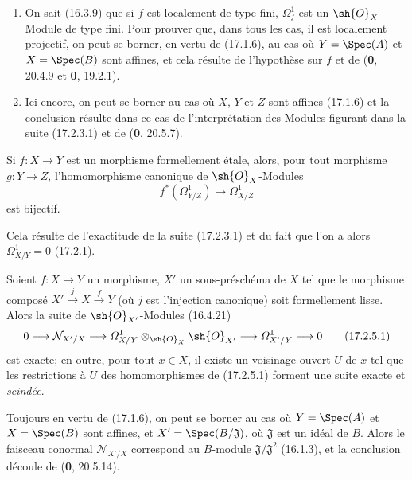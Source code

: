 \begin{enumerate}
  \item[(i)] On sait (16.3.9) que si $f$ est localement de type fini, $\varOmega_f^1$ est un $\sh{O}_X$-Module de type fini. Pour prouver que, dans tous les cas, il est localement projectif, on peut se borner, en vertu de (17.1.6), au cas où $Y=\Spec(A)$ et $X=\Spec(B)$ sont affines, et cela résulte de l'hypothèse sur $f$ et de (\textbf{0}, 20.4.9 et \textbf{0}, 19.2.1).
  \item[(ii)] Ici encore, on peut se borner au cas où $X$, $Y$ et $Z$ sont affines (17.1.6) et la conclusion résulte dans ce cas de l'interprétation des Modules figurant dans la suite (17.2.3.1) et de (\textbf{0}, 20.5.7).
\end{enumerate}

\begin{corollary}[17.2.4]
\label{IV.17.2.4}
Si $f:X\to Y$ est un morphisme formellement étale, alors, pour tout morphisme $g:Y\to Z$, l'homomorphisme canonique de $\sh{O}_X$-Modules
\[
  f^*(\varOmega_{Y/Z}^1)\longrightarrow\varOmega_{X/Z}^1
\]
est bijectif.
\end{corollary}

Cela résulte de l'exactitude de la suite (17.2.3.1) et du fait que l'on a alors $\varOmega_{X/Y}^1=0$ (17.2.1).

\begin{proposition}[17.2.5]
\label{IV.17.2.5}
Soient $f:X\to Y$ un morphisme, $X'$ un sous-préschéma de $X$ tel que le morphisme composé $X'\xrightarrow{j}X\xrightarrow{f}Y$ (où $j$ est l'injection canonique) soit formellement lisse. Alors la suite de $\sh{O}_{X'}$-Modules \textup{(16.4.21)}
\[
\label{IV.17.2.5.1}
  0\longrightarrow\mathcal{N}_{X'/X}\longrightarrow\varOmega_{X/Y}^1\otimes_{\sh{O}_X}\sh{O}_{X'}\longrightarrow\varOmega_{X'/Y}^1\longrightarrow0
  \tag{17.2.5.1}
\]
est exacte; en outre, pour tout $x\in X$, il existe un voisinage ouvert $U$ de $x$ tel que les restrictions à $U$ des homomorphismes de \textup{(17.2.5.1)} forment une suite exacte et \emph{scindée}.
\end{proposition}

Toujours en vertu de (17.1.6), on peut se borner au cas où $Y=\Spec(A)$ et $X=\Spec(B)$ sont affines, et $X'=\Spec(B/\mathfrak{J})$, où $\mathfrak{J}$ est un idéal de $B$. Alors le faisceau conormal $\mathcal{N}_{X'/X}$ correspond au $B$-module $\mathfrak{J}/\mathfrak{J}^2$ (16.1.3), et la conclusion découle de (\textbf{0}, 20.5.14).


